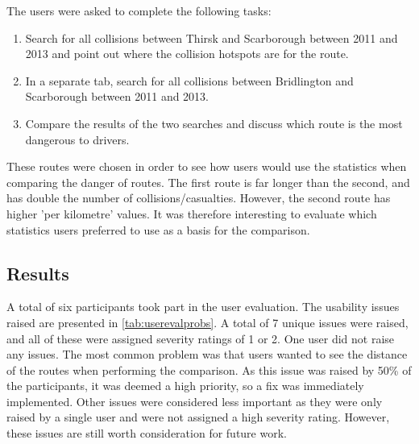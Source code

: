 \documentclass[authoryearcitations]{UoYCSproject}
\begin{document}
The users were asked to complete the following tasks:

\begin{enumerate}
	\item Search for all collisions between Thirsk and Scarborough between 2011 and 2013 and point out where the collision hotspots are for the route.
	\item In a separate tab, search for all collisions between Bridlington and Scarborough between 2011 and 2013.
	\item Compare the results of the two searches and discuss which route is the most dangerous to drivers.
\end{enumerate}

These routes were chosen in order to see how users would use the statistics when comparing the danger of routes. The first route is far longer than the second, and has double the number of collisions/casualties. However, the second route has higher 'per kilometre' values. It was therefore interesting to evaluate which statistics users preferred to use as a basis for the comparison.

\subsection{Results}

A total of six participants took part in the user evaluation. The usability issues raised are presented in \autoref{tab:userevalprobs}. A total of 7 unique issues were raised, and all of these were assigned severity ratings of 1 or 2. One user did not raise any issues. The most common problem was that users wanted to see the distance of the routes when performing the comparison. As this issue was raised by 50\% of the participants, it was deemed a high priority, so a fix was immediately implemented. Other issues were considered less important as they were only raised by a single user and were not assigned a high severity rating. However, these issues are still worth consideration for future work.
\end{document}
